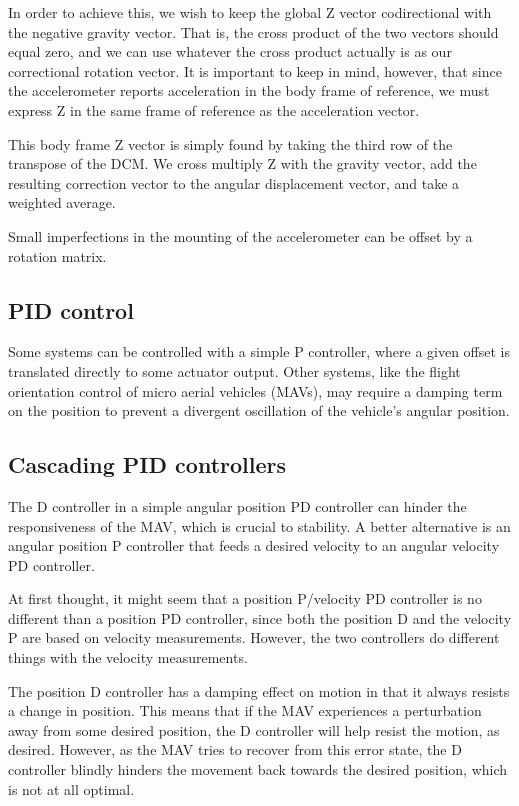 \documentclass[12pt,letterpaper]{article}
\begin{document}
In order to achieve this, we wish to keep the global Z vector codirectional
with the negative gravity vector. That is, the cross product of the two vectors
should equal zero, and we can use whatever the cross product actually is as our
correctional rotation vector. It is important to keep in mind, however, that
since the accelerometer reports acceleration in the body frame of reference, we
must express Z in the same frame of reference as the acceleration vector.

This body frame Z vector is simply found by taking the third row of the
transpose of the DCM. We cross multiply Z with the gravity vector, add the
resulting correction vector to the angular displacement vector, and take a
weighted average.

Small imperfections in the mounting of the accelerometer can be offset by a
rotation matrix.


\subsection{PID control}

Some systems can be controlled with a simple P controller, where a given offset
is translated directly to some actuator output. Other systems, like the flight
orientation control of micro aerial vehicles (MAVs), may require a damping term
on the position to prevent a divergent oscillation of the vehicle's angular
position.


\subsection{Cascading PID controllers}

The D controller in a simple angular position PD controller can hinder the
responsiveness of the MAV, which is crucial to stability. A better alternative
is an angular position P controller that feeds a desired velocity to an angular
velocity PD controller.

At first thought, it might seem that a position P/velocity PD controller is no
different than a position PD controller, since both the position D and the
velocity P are based on velocity measurements. However, the two controllers do
different things with the velocity measurements.

The position D controller has a damping effect on motion in that it always
resists a change in position. This means that if the MAV experiences a
perturbation away from some desired position, the D controller will help resist
the motion, as desired. However, as the MAV tries to recover from this error
state, the D controller blindly hinders the movement back towards the desired
position, which is not at all optimal.
\end{document}

